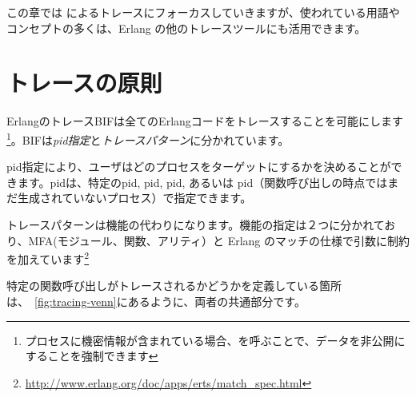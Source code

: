 この章では  によるトレースにフォーカスしていきますが、使われている用語やコンセプトの多くは、Erlang の他のトレースツールにも活用できます。

\section{トレースの原則}
\label{sec:tracing-princples}

ErlangのトレースBIFは全てのErlangコードをトレースすることを可能にします\footnote{プロセスに機密情報が含まれている場合、を呼ぶことで、データを非公開にすることを強制できます}。BIFは\emph{pid指定}と\emph{トレースパターン}に分かれています。

pid指定により、ユーザはどのプロセスをターゲットにするかを決めることができます。pidは、特定のpid, pid, pid, あるいは pid（関数呼び出しの時点ではまだ生成されていないプロセス）で指定できます。

トレースパターンは機能の代わりになります。機能の指定は２つに分かれており、MFA(モジュール、関数、アリティ）と Erlang のマッチの仕様で引数に制約を加えています\footnote{\href{http://www.erlang.org/doc/apps/erts/match\_spec.html}{http://www.erlang.org/doc/apps/erts/match\_spec.html}}

特定の関数呼び出しがトレースされるかどうかを定義している箇所は、~\ref{fig:tracing-venn}にあるように、両者の共通部分です。

